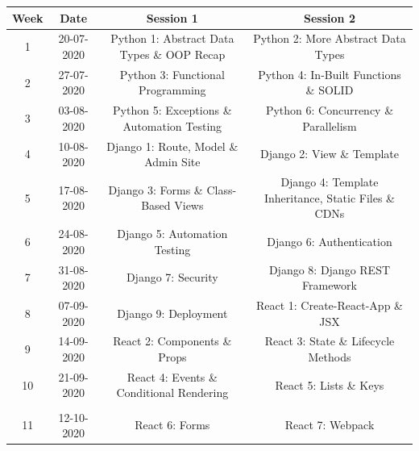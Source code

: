 \documentclass{article}
\begin{document}
\renewcommand{\arraystretch}{1.5}
\begin{tabular}{|c|c|c|c|}
	\hline
	\textbf{Week} & \textbf{Date}     & \textbf{Session 1}                                     & \textbf{Session 2}                                          \\ \hline
	\small 1      & \small 20-07-2020 & \small Python 1: Abstract Data Types \& OOP Recap      & \small Python 2: More Abstract Data Types                   \\ \hline
	\small 2      & \small 27-07-2020 & \small Python 3: Functional Programming                & \small Python 4: In-Built Functions \& SOLID                \\ \hline
	\small 3      & \small 03-08-2020 & \small Python 5: Exceptions \& Automation Testing      & \small Python 6: Concurrency \& Parallelism                 \\ \hline
	\small 4      & \small 10-08-2020 & \small Django 1: Route, Model \& Admin Site            & \small Django 2: View \& Template                           \\ \hline
	\small 5      & \small 17-08-2020 & \small Django 3: Forms \& Class-Based Views            & \small Django 4: Template Inheritance, Static Files \& CDNs \\ \hline
	\small 6      & \small 24-08-2020 & \small Django 5: Automation Testing                    & \small Django 6: Authentication                             \\ \hline
	\small 7      & \small 31-08-2020 & \small Django 7: Security                              & \small Django 8: Django REST Framework                      \\ \hline
	\small 8      & \small 07-09-2020 & \small Django 9: Deployment                            & \small React 1: Create-React-App \& JSX                     \\ \hline
	\small 9      & \small 14-09-2020 & \small React 2: Components \& Props        & \small React 3: State \& Lifecycle Methods                  \\ \hline
	\small 10     & \small 21-09-2020 & \small React 4: Events \& Conditional Rendering & \small React 5:  Lists \& Keys                              \\ \hline
	\rowcolor{yellow} \multicolumn{4}{|c|}{\small Mid Term Break}                                                             \\ \hline
	\small 11     & \small 12-10-2020 & \small React 6: Forms          & \small React 7: Webpack      \\ \hline                                           

\end{tabular}
\end{document}
